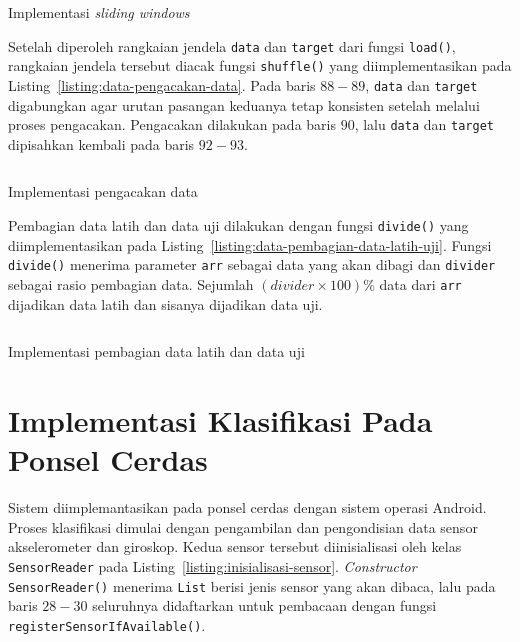 \begin{listing}[h]
    \inputminted[firstline=60,firstnumber=60,lastline=79]{python}{../har/data.py}
    \caption{Implementasi \textit{sliding windows}}
    \label{listing:data-sliding-window}
\end{listing}

Setelah diperoleh rangkaian jendela \texttt{data} dan \texttt{target} dari fungsi \texttt{load()}, rangkaian jendela tersebut diacak fungsi \texttt{shuffle()} yang diimplementasikan pada Listing~\ref{listing:data-pengacakan-data}. Pada baris $88-89$, \texttt{data} dan \texttt{target} digabungkan agar urutan pasangan keduanya tetap konsisten setelah melalui proses pengacakan. Pengacakan dilakukan pada baris $90$, lalu \texttt{data} dan \texttt{target} dipisahkan kembali pada baris $92-93$.

\begin{listing}[h]
    \inputminted[firstline=82,firstnumber=82,lastline=95]{python}{../har/data.py}
    \caption{Implementasi pengacakan data}
    \label{listing:data-pengacakan-data}
\end{listing}

Pembagian data latih dan data uji dilakukan dengan fungsi \texttt{divide()} yang diimplementasikan pada Listing~\ref{listing:data-pembagian-data-latih-uji}. Fungsi \texttt{divide()} menerima parameter \texttt{arr} sebagai data yang akan dibagi dan \texttt{divider} sebagai rasio pembagian data. Sejumlah $(divider \times 100) \%$ data dari \texttt{arr} dijadikan data latih dan sisanya dijadikan data uji.

\begin{listing}[h]
    \inputminted[firstline=98,firstnumber=98,lastline=107]{python}{../har/data.py}
    \caption{Implementasi pembagian data latih dan data uji}
    \label{listing:data-pembagian-data-latih-uji}
\end{listing}

\section{Implementasi Klasifikasi Pada Ponsel Cerdas}
Sistem diimplemantasikan pada ponsel cerdas dengan sistem operasi Android. Proses klasifikasi dimulai dengan pengambilan dan pengondisian data sensor akselerometer dan giroskop. Kedua sensor tersebut diinisialisasi oleh kelas \texttt{SensorReader} pada Listing~\ref{listing:inisialisasi-sensor}. \textit{Constructor} \texttt{SensorReader()} menerima \texttt{List} berisi jenis sensor yang akan dibaca, lalu pada baris $28-30$ seluruhnya didaftarkan untuk pembacaan dengan fungsi \texttt{registerSensorIfAvailable()}.

